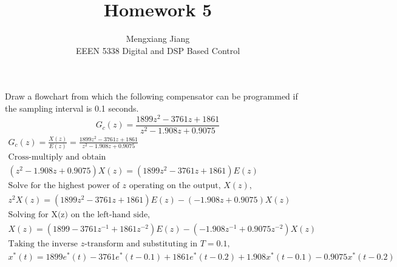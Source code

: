 \documentclass[12pt]{article}
\newenvironment{problem}[2][Problem]{\begin{trivlist}
\item[\hskip \labelsep {\bfseries #1}\hskip \labelsep {\bfseries #2.}]}{\end{trivlist}}
\begin{document}
 
 
\title{Homework 5}%
\author{Mengxiang Jiang\\ %
EEEN 5338 Digital and DSP Based Control} %
 
\maketitle
 
\begin{problem}{1} %
    Draw a flowchart from which the following compensator can be programmed if the sampling interval is 0.1 seconds.
    $$ G_c(z) = \frac{1899z^2-3761z+1861}{z^2-1.908z+0.9075}$$
    \begin{align*}
        G_c(z) = \frac{X(z)}{E(z)} = \frac{1899z^2-3761z+1861}{z^2-1.908z+0.9075}\\
        \text{Cross-multiply and obtain}\\
        (z^2-1.908z+0.9075)X(z) = (1899z^2-3761z+1861)E(z)\\
        \text{Solve for the highest power of $z$ operating on the output, $X(z)$,}\\
        z^2X(z) = (1899z^2-3761z+1861)E(z) - (-1.908z + 0.9075)X(z)\\
        \text{Solving for X(z) on the left-hand side,}\\
        X(z) = (1899-3761z^{-1}+1861z^{-2})E(z) - (-1.908z^{-1}+0.9075z^{-2})X(z)\\
        \text{Taking the inverse $z$-transform and substituting in $T=0.1$,}\\
        x^*(t) = 1899e^*(t) - 3761e^*(t-0.1) + 1861e^*(t-0.2) + 1.908x^*(t-0.1) - 0.9075x^*(t-0.2)
    \end{align*}


\end{problem}
\end{document}
